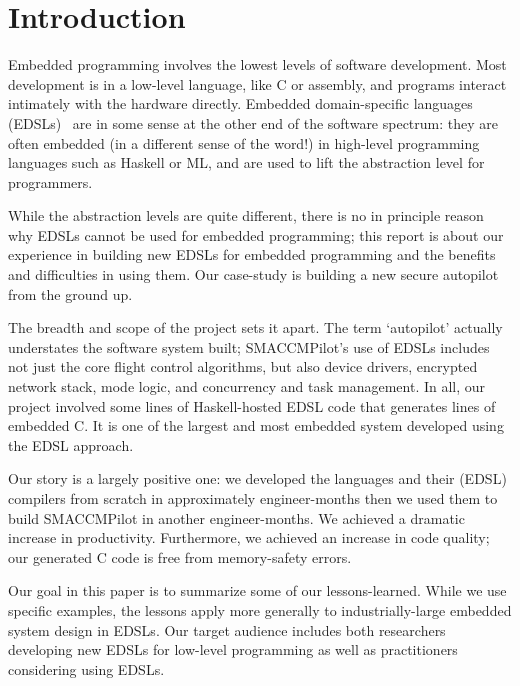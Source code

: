 \section{Introduction}

Embedded programming involves the lowest levels of software development.  Most
development is in a low-level language, like C or assembly, and programs
interact intimately with the hardware directly.  Embedded domain-specific
languages (EDSLs)~\cite{} are in some sense at the other end of the software
spectrum: they are often embedded (in a different sense of the word!) in
high-level programming languages such as Haskell or ML, and are used to
lift the abstraction level for programmers.

While the abstraction levels are quite different, there is no in principle
reason why EDSLs cannot be used for embedded programming; this report
is about our experience in building new EDSLs for embedded programming and the
benefits and difficulties in using them.  Our case-study is building a new
secure autopilot from the ground up.

The breadth and scope of the project sets it apart.  The term `autopilot'
actually understates the software system built; SMACCMPilot's use of EDSLs
includes not just the core flight control algorithms, but also device drivers,
encrypted network stack, mode logic, and concurrency and task management.  In
all, our project involved some  lines of Haskell-hosted EDSL code that
generates  lines of embedded C.  It is one of the largest and most
embedded system developed using the EDSL approach.

Our story is a largely positive one: we developed the languages and their (EDSL)
compilers from scratch in approximately  engineer-months then we used
them to build SMACCMPilot in another  engineer-months.  We achieved a
dramatic increase in productivity.  Furthermore, we achieved an increase in
code quality; our generated C code is free from memory-safety errors.

Our goal in this paper is to summarize some of our lessons-learned.  While we
use specific examples, the lessons apply more generally to industrially-large
embedded system design in EDSLs.  Our target audience includes both researchers
developing new EDSLs for low-level programming as well as practitioners
considering using EDSLs.




